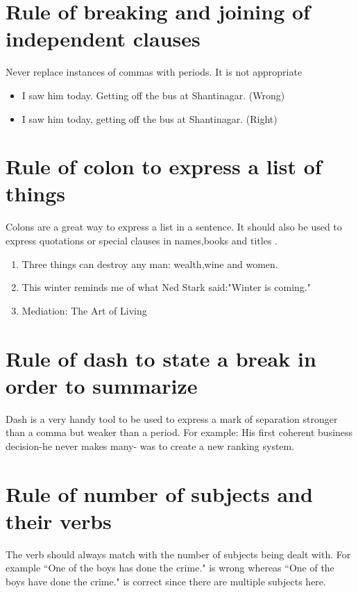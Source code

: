 \documentclass{report}
\begin{document}
\section{Rule of breaking and joining of independent clauses}
Never replace instances of commas with periods. It is not appropriate
\begin{itemize}
\item I saw him today. Getting off the bus at Shantinagar. (Wrong)
\item I saw him today, getting off the bus at Shantinagar. (Right)
\end{itemize}


\section{Rule of colon to express a list of things}
Colons are a great way to express a list in a sentence. It should also be used to express quotations or special clauses in names,books and titles .
\begin{enumerate}
\item Three things can destroy any man: wealth,wine and women.
\item This winter reminds me of what Ned Stark said:"Winter is coming."
\item Mediation: The Art of Living
\end{enumerate}


\section{Rule of dash to state a break in order to summarize}
Dash is a very handy tool to be used to express a mark of separation stronger than a comma but weaker than a period. For example: His first coherent business decision-he never makes many- was to create a new ranking system.



\section{Rule of number of subjects and their verbs}
The verb should always match with the number of subjects being dealt with.
For example ``One of the boys has done the crime." is wrong whereas ``One of the boys have done the crime." is correct since there are multiple subjects here.
\end{document}
